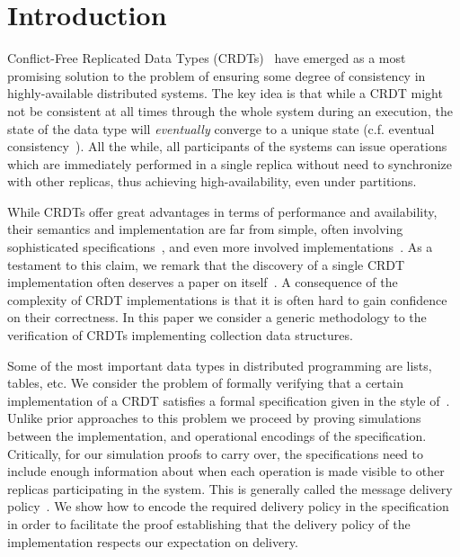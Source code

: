 \section{Introduction}
\label{sec:introduction}

Conflict-Free Replicated Data Types (CRDTs)~\cite{ShapiroPBZ11} have
emerged as a most promising solution to the problem of ensuring
some degree of consistency in highly-available distributed systems.
%
The key idea is that while a CRDT might not be consistent at all times
through the whole system during an execution, the state of the
data type will \emph{eventually} converge to a unique state (c.f.
eventual consistency~\cite{Burkhardt}).
%
All the while, all participants of the systems can issue operations
which are immediately performed in a single replica without need to
synchronize with other replicas, thus achieving high-availability,
even under partitions.

While CRDTs offer great advantages in terms of performance and
availability, their semantics and implementation are far from simple,
often involving sophisticated specifications~\cite{Burkhardt}, and
even more involved implementations~\cite{ShapiroPBZ11}.
%
As a testament to this claim, we remark that the discovery of a single
CRDT implementation often deserves a paper on itself~\cite{RAG, WOOT,
  ...}.
%
A consequence of the complexity of CRDT implementations is that it is
often hard to gain confidence on their correctness.
%
In this paper we consider a generic methodology to the verification of
CRDTs implementing collection data structures.

 {
  Some of the most important data types in
  distributed programming are lists, tables, etc.
}
We consider the problem of formally verifying that a certain
implementation of a CRDT satisfies a formal specification given in the
style of~\cite{Burkhardt}.
%
Unlike prior approaches to this problem we proceed by
proving simulations between the implementation, and operational
encodings of the specification.
%
Critically, for our simulation proofs to carry over, the
specifications need to include enough information about when each
operation is made visible to other replicas participating in the
system.
%
This is generally called the message delivery policy~\cite{}.
%
We show how to encode the required delivery policy in the
specification in order to facilitate the proof establishing that the
delivery policy of the implementation respects our expectation on
delivery. 


